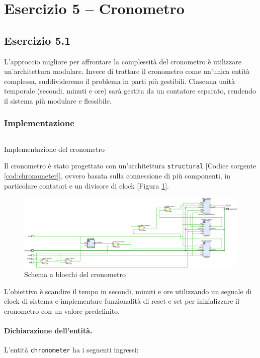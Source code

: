 \section{Esercizio 5 -- Cronometro}
\subsection{Esercizio 5.1}
L'approccio migliore per affrontare la complessità del cronometro è utilizzare un'architettura modulare. Invece di trattare il cronometro come un'unica entità complessa, suddivideremo il problema in parti più gestibili. Ciascuna unità temporale (secondi, minuti e ore) sarà gestita da un contatore separato, rendendo il sistema più modulare e flessibile.

\subsubsection{Implementazione}
\begin{code}
    \inputminted{vhdl}{vhdl/chronometer.vhd}
    \caption{Implementazione del cronometro}
    \label{cod:chronometer}
\end{code}

Il cronometro è stato progettato con un'architettura \texttt{structural} [Codice sorgente \ref{cod:chronometer}], ovvero basata sulla connessione di più componenti, in particolare contatori e un divisore di clock [Figura \ref{fig:5_1_CHRONOMETER}].

\begin{figure}[h]
    \centering
    \includegraphics[width=\textwidth]{img/5_1_CHRONOMETER.pdf}
    \caption{Schema a blocchi del cronometro}
    \label{fig:5_1_CHRONOMETER}
\end{figure}

L'obiettivo è scandire il tempo in secondi, minuti e ore utilizzando un segnale di clock di sistema e implementare funzionalità di reset e set per inizializzare il cronometro con un valore predefinito.

\paragraph{Dichiarazione dell’entità.}
L'entità \texttt{chronometer} ha i seguenti ingressi:

